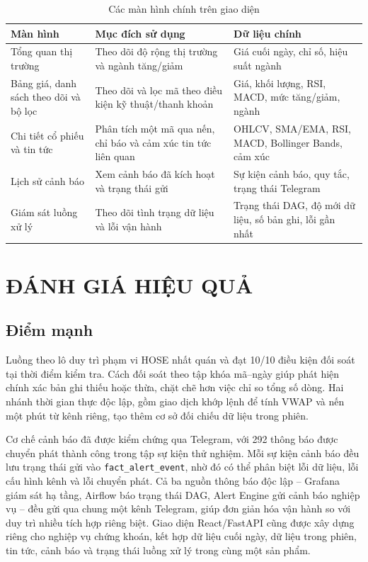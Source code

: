 \documentclass[conference,a4paper]{IEEEtran}
\newcommand{\code}[1]{\texttt{#1}}
\begin{document}
\begin{table}[H]
\caption{Các màn hình chính trên giao diện}
\label{tab:frontend-screens}
\centering
\scriptsize
\begin{tabular}{p{1.8cm}p{2.6cm}p{2.3cm}}
\toprule
\textbf{Màn hình} & \textbf{Mục đích sử dụng} & \textbf{Dữ liệu chính} \\
\midrule
Tổng quan thị trường & Theo dõi độ rộng thị trường và ngành tăng/giảm & Giá cuối ngày, chỉ số, hiệu suất ngành \\
Bảng giá, danh sách theo dõi và bộ lọc & Theo dõi và lọc mã theo điều kiện kỹ thuật/thanh khoản & Giá, khối lượng, RSI, MACD, mức tăng/giảm, ngành \\
Chi tiết cổ phiếu và tin tức & Phân tích một mã qua nến, chỉ báo và cảm xúc tin tức liên quan & OHLCV, SMA/EMA, RSI, MACD, Bollinger Bands, cảm xúc \\
Lịch sử cảnh báo & Xem cảnh báo đã kích hoạt và trạng thái gửi & Sự kiện cảnh báo, quy tắc, trạng thái Telegram \\
Giám sát luồng xử lý & Theo dõi tình trạng dữ liệu và lỗi vận hành & Trạng thái DAG, độ mới dữ liệu, số bản ghi, lỗi gần nhất \\
\bottomrule
\end{tabular}
\end{table}

\section{ĐÁNH GIÁ HIỆU QUẢ}

\subsection{Điểm mạnh}

Luồng theo lô duy trì phạm vi HOSE nhất quán và đạt 10/10 điều kiện đối soát tại thời điểm kiểm tra. Cách đối soát theo tập khóa mã--ngày giúp phát hiện chính xác bản ghi thiếu hoặc thừa, chặt chẽ hơn việc chỉ so tổng số dòng. Hai nhánh thời gian thực độc lập, gồm giao dịch khớp lệnh để tính VWAP và nến một phút từ kênh riêng, tạo thêm cơ sở đối chiếu dữ liệu trong phiên.

Cơ chế cảnh báo đã được kiểm chứng qua Telegram, với 292 thông báo được chuyển phát thành công trong tập sự kiện thử nghiệm. Mỗi sự kiện cảnh báo đều lưu trạng thái gửi vào \code{fact\_alert\_event}, nhờ đó có thể phân biệt lỗi dữ liệu, lỗi cấu hình kênh và lỗi chuyển phát. Cả ba nguồn thông báo độc lập -- Grafana giám sát hạ tầng, Airflow báo trạng thái DAG, Alert Engine gửi cảnh báo nghiệp vụ -- đều gửi qua chung một kênh Telegram, giúp đơn giản hóa vận hành so với duy trì nhiều tích hợp riêng biệt. Giao diện React/FastAPI cũng được xây dựng riêng cho nghiệp vụ chứng khoán, kết hợp dữ liệu cuối ngày, dữ liệu trong phiên, tin tức, cảnh báo và trạng thái luồng xử lý trong cùng một sản phẩm.
\end{document}
